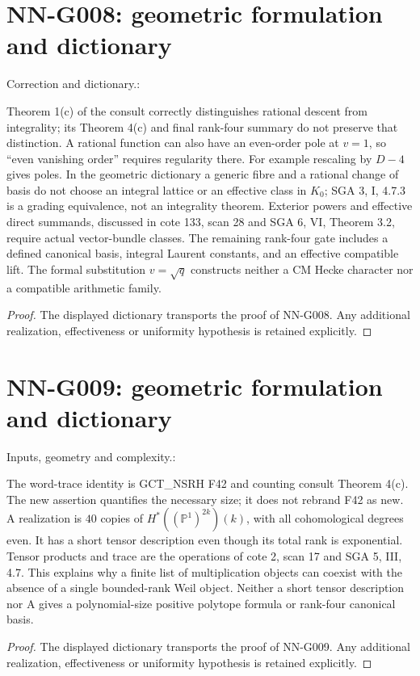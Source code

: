 \section{NN-G008: geometric formulation and dictionary}
\begin{geometricstatement}[NN-G008]
Correction and dictionary.:

Theorem 1(c) of the consult correctly distinguishes rational
descent from integrality; its Theorem 4(c) and final rank-four
summary do not preserve that distinction. A rational function
can also have an even-order pole at $v=1$, so ``even vanishing
order'' requires regularity there. For example rescaling by
$D-4$ gives poles. In the geometric dictionary a generic fibre
and a rational change of basis do not choose an integral lattice
or an effective class in $K_0$; SGA 3, I, 4.7.3 is a grading
equivalence, not an integrality theorem. Exterior powers and
effective direct summands, discussed in cote 133, scan 28 and
SGA 6, VI, Theorem 3.2, require actual vector-bundle classes.
The remaining rank-four gate includes a defined canonical basis,
integral Laurent constants, and an effective compatible lift.
The formal substitution $v=\sqrt q$ constructs neither a CM
Hecke character nor a compatible arithmetic family.


\end{geometricstatement}
\begin{proof} The displayed dictionary transports the proof of NN-G008. Any additional realization, effectiveness or uniformity hypothesis is retained explicitly.\end{proof}


\section{NN-G009: geometric formulation and dictionary}
\begin{geometricstatement}[NN-G009]
Inputs, geometry and complexity.:

The word-trace identity is GCT\_NSRH F42 and counting consult
Theorem 4(c). The new assertion quantifies the necessary size;
it does not rebrand F42 as new. A realization is $40$ copies of
$H^*((\mathbb P^1)^{2k})(k)$, with all cohomological degrees even.
It has a short tensor description even though its total rank is
exponential. Tensor products and trace are the operations of
cote 2, scan 17 and SGA 5, III, 4.7. This explains why a finite
list of multiplication objects can coexist with the absence of
a single bounded-rank Weil object. Neither a short tensor
description nor A gives a polynomial-size positive polytope
formula or rank-four canonical basis.


\end{geometricstatement}
\begin{proof} The displayed dictionary transports the proof of NN-G009. Any additional realization, effectiveness or uniformity hypothesis is retained explicitly.\end{proof}


